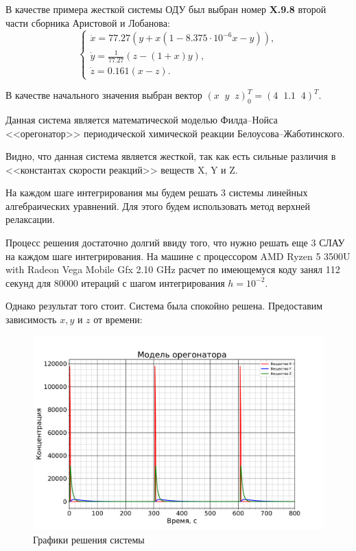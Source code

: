 		В качестве примера жесткой системы ОДУ был выбран номер \textbf{X.9.8} второй части сборника Аристовой и Лобанова:
		\begin{equation*}
			\begin{cases*}
				\dot{x} = 77.27(y + x (1 - 8.375 \cdot 10^{-6} x - y)), \\
				\dot{y} = \frac{1}{77.27}(z - (1 + x)y), \\
				\dot{z} = 0.161(x - z).
			\end{cases*}
		\end{equation*}
	
		В качестве начального значения выбран вектор $(x \;\; y \;\; z)^T_0 = (4 \;\; 1.1 \;\; 4)^T$.
		
		Данная система является математической моделью Филда–Нойса <<орегонатор>> периодической химической реакции		Белоусова–Жаботинского.
		
		Видно, что данная система является жесткой, так как есть сильные различия в <<константах скорости реакций>> веществ X, Y и Z.
		
		На каждом шаге интегрирования мы будем решать 3 системы линейных алгебраических уравнений. Для этого будем использовать метод верхней релаксации.
		
		Процесс решения достаточно долгий ввиду того, что нужно решать еще 3 СЛАУ на каждом шаге интегрирования. На машине с процессором AMD Ryzen 5 3500U with Radeon Vega Mobile Gfx 2.10 GHz расчет по имеющемуся коду занял 112 секунд для 80000 итераций с шагом интегрирования $h = 10^{-2}$.
		
		Однако результат того стоит. Система была спокойно решена. Предоставим зависимость $x, y$ и $z$ от времени:
		\begin{figure}[h!]
			\centering
			\includegraphics[width=1.1\linewidth]{Pictures/Full.pdf}
			\caption{Графики решения системы}
		\end{figure}
	
